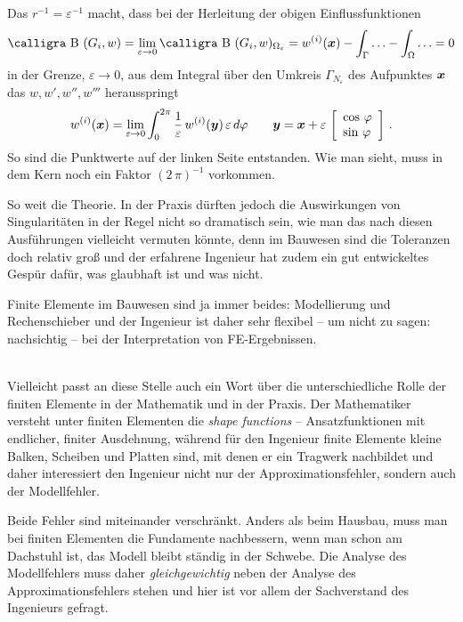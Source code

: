 {Das $r^{-1} = \varepsilon^{-1}$ macht, dass bei der Herleitung der obigen Einflussfunktionen
  \begin{align}
  \text{\normalfont\calligra B\,\,}(G_i,w) = \lim_{\varepsilon \to 0} \text{\normalfont\calligra B\,\,}(G_i,w)_{\Omega_\varepsilon} = w^{(i)}(\vek x) - \int_{\Gamma} \ldots - \int_{\Omega} \ldots = 0
    \end{align}
 in der Grenze, $\varepsilon \to 0$, aus dem Integral \"{u}ber den Umkreis $\Gamma_{N_{\varepsilon}}$ des Aufpunktes $\vek x$ das $w, w', w'', w'''$ herausspringt
\begin{align}
w^{(i)}(\vek x) = \lim_{\varepsilon \to 0} \int_0^{2\pi} \frac{1}{\varepsilon}\,w^{(i)}(\vek y)\,\varepsilon \,d\Np \qquad \vek y = \vek x + \varepsilon \,\left[\barr{l} \cos\,\Np \\ \sin\,\Np\earr\right]\,.
\end{align}
So sind die Punktwerte auf der linken Seite entstanden. Wie man sieht, muss in dem Kern noch ein Faktor $(2\,\pi)^{-1}$ vorkommen.

So weit die Theorie. In der Praxis d\"{u}rften jedoch die Auswirkungen von Singularit\"{a}ten in der Regel nicht so dramatisch sein, wie man das nach diesen Ausf\"{u}hrungen vielleicht vermuten k\"{o}nnte, denn im Bauwesen sind die Toleranzen doch relativ gro{\ss} und der erfahrene Ingenieur hat zudem ein gut entwickeltes Gesp\"{u}r daf\"{u}r, was glaubhaft ist und was nicht. \\

\hspace*{-12pt}\colorbox{highlightBlue}{\parbox{0.98\textwidth}{Finite Elemente im Bauwesen sind ja immer beides: Modellierung und \glq Rechenschieber\grq{} und der Ingenieur ist daher sehr flexibel -- um nicht zu sagen: nachsichtig -- bei der Interpretation von FE-Ergebnissen.}}\\

Vielleicht passt an diese Stelle auch ein Wort \"{u}ber die unterschiedliche Rolle der finiten Elemente in der Mathematik und in der Praxis. Der Mathematiker versteht unter finiten Elementen die {\em shape functions\/} -- Ansatzfunktionen mit endlicher, finiter Ausdehnung, w\"{a}hrend f\"{u}r den Ingenieur finite Elemente kleine Balken, Scheiben und Platten sind, mit denen er ein Tragwerk nachbildet und daher interessiert den Ingenieur  nicht nur der Approx\-imationsfehler, sondern auch der Modellfehler.

Beide Fehler sind miteinander verschr\"{a}nkt. Anders als beim Hausbau, muss man bei finiten Elementen die Fundamente nachbessern, wenn man schon am Dachstuhl ist, das Modell bleibt st\"{a}ndig in der Schwebe. Die Analyse des Modellfehlers muss daher {\em gleichgewichtig\/} neben der Analyse des Approx\-imationsfehlers stehen und hier ist vor allem der Sachverstand des Ingenieurs gefragt.

}
